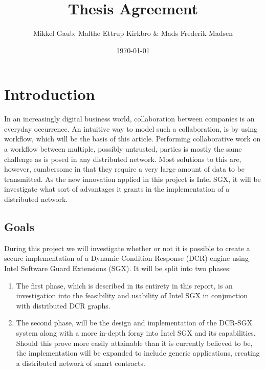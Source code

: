 \documentclass[12pt]{article}
\author{Mikkel Gaub, Malthe Ettrup Kirkbro \& Mads Frederik Madsen}
\title{Thesis Agreement}
\date{\today}
\begin{document}
\maketitle
\thispagestyle{empty}

\pagebreak

\tableofcontents

\pagebreak

	\section{Introduction}

	In an increasingly digital business world, collaboration between companies is an everyday occurrence.
	An intuitive way to model such a collaboration, is by using workflow, which will be the basis of this article.
	Performing collaborative work on a workflow between multiple, possibly untrusted, parties is mostly the same challenge as is posed in any distributed network. 
	Most solutions to this are, however, cumbersome in that they require a very large amount of data to be transmitted.
	As the new innovation applied in this project is Intel SGX, it will be investigate what sort of advantages it grants in the implementation of a distributed network.

		\subsection{Goals}

		During this project we will investigate whether or not it is possible to create a secure implementation of a Dynamic Condition Response\cite{dcr-paper} (DCR) engine using Intel Software Guard Extensions\cite{intel-sgx-explained} (SGX).
		It will be split into two phases:
		\begin{enumerate}
			\item The first phase, which is described in its entirety in this report, is an investigation into the feasibility and usability of Intel SGX in conjunction with distributed DCR graphs.
			\item The second phase, will be the design and implementation of the DCR-SGX system along with a more in-depth foray into Intel SGX and its capabilities. Should this prove more easily attainable than it is currently believed to be, the implementation will be expanded to include generic applications, creating a distributed network of smart contracts\cite{smart-contracts}.
		\end{enumerate}
\end{document}
